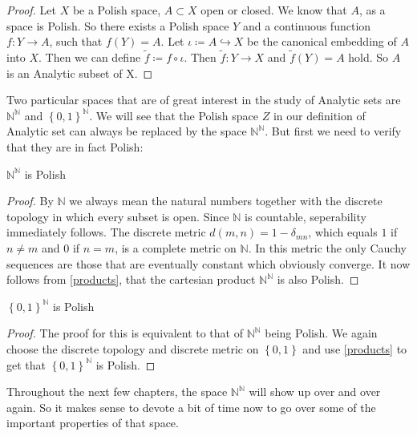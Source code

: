 \documentclass[10pt, a4paper, titlepage]{article}
\numberwithin{equation}{section}
\begin{document}
\begin{proof}
Let $X$ be a Polish space, $A \subset X$ open or closed.
We know that $A$, as a space is Polish. So there exists a Polish space $Y$ and a continuous function  $f:Y\to A$, such that  $f(Y) = A$. 
	Let $\iota  \coloneq A \hookrightarrow X$ be the canonical embedding of  $A$ into  $X$. 
	Then we can define  $\tilde{f}  \coloneq f \circ \iota$. Then  $\tilde{f}:Y \to X $ and  $\tilde{f}(Y) = A$ hold. So  $A$ is an Analytic subset of X.
\end{proof}

Two particular spaces that are of great interest in the study of Analytic sets are $\mathbb{N}^{\mathbb{N}}$ and $\left\{ 0,1 \right\}^{\mathbb{N}} $.
We will see that the Polish space $Z$ in our definition of Analytic set can always be replaced by the space $\mathbb{N}^{\mathbb{N}}$. But first we need to verify that they are in fact Polish:

\begin{theorem}
	$\mathbb{N}^\mathbb{N}$ is Polish
\end{theorem}
\begin{proof}
By $\mathbb{N}$ we always mean the natural numbers together with the discrete topology in which every subset is open. Since $\mathbb{N}$ is countable, seperability immediately follows.
The discrete metric $d\left( m,n \right) = 1 - \delta_{mn} $, which equals $1$ if  $n \neq m$ and $0$ if $n=m$, is a complete metric on  $\mathbb{N}$.
In this metric the only Cauchy sequences are those that are eventually constant which obviously converge.
It now follows from \autoref{products}, that the cartesian product $\mathbb{N}^{\mathbb{N}}$ is also Polish.
\end{proof}

\begin{theorem}
	$\left\{ 0,1 \right\}^\mathbb{N}$ is Polish
\end{theorem}
\begin{proof}
	The proof for this is equivalent to that of $\mathbb{N}^{\mathbb{N}}$ being Polish. We again choose the discrete topology and discrete metric on $\left\{ 0,1 \right\} $ and use \autoref{products} to get that $\left\{ 0,1 \right\} ^{\mathbb{N}} $ is Polish.	
\end{proof}



Throughout the next few chapters, the space $\mathbb{N}^\mathbb{N}$ will show up
over and over again. So it makes sense to devote a bit of time now to go over
some of the important properties of that space.
\end{document}
